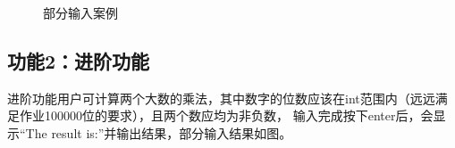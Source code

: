 \documentclass[a4paper, 11pt, UTF8]{ctexart}
\begin{document}
\begin{figure}[H]
    \centering
    \quad
    \quad
    \quad
    \caption{部分输入案例}
\end{figure}

\subsection{功能2：进阶功能}

进阶功能用户可计算两个大数的乘法，其中数字的位数应该在int范围内（远远满足作业100000位的要求），且两个数应均为非负数，
输入完成按下enter后，会显示“The result is:”并输出结果，部分输入结果如图。
\end{document}
